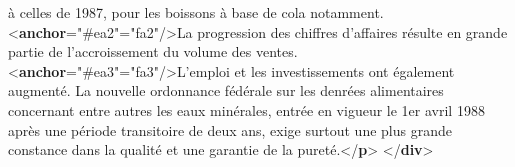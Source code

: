\begin{shaded}
\hspace*{1em}\hspace*{1em} à celles de 1987, pour les boissons à base de cola\mbox{}\newline 
\hspace*{1em}\hspace*{1em} notamment. {<\textbf{anchor}\hspace*{1em}{corresp}="{\#ea2}"\hspace*{1em}{xml:id}="{fa2}"/>}La progression des\mbox{}\newline 
\hspace*{1em}\hspace*{1em} chiffres d'affaires résulte en grande partie de l'accroissement\mbox{}\newline 
\hspace*{1em}\hspace*{1em} du volume des ventes. {<\textbf{anchor}\hspace*{1em}{corresp}="{\#ea3}"\hspace*{1em}{xml:id}="{fa3}"/>}L'emploi et\mbox{}\newline 
\hspace*{1em}\hspace*{1em} les investissements ont également augmenté.\mbox{}\newline 
{}La nouvelle ordonnance fédérale\mbox{}\newline 
\hspace*{1em}\hspace*{1em} sur les denrées alimentaires concernant entre autres les eaux\mbox{}\newline 
\hspace*{1em}\hspace*{1em} minérales, entrée en vigueur le 1er avril 1988 après\mbox{}\newline 
\hspace*{1em}\hspace*{1em} une période transitoire de deux ans, exige surtout une plus\mbox{}\newline 
\hspace*{1em}\hspace*{1em} grande constance dans la qualité et une garantie de la\mbox{}\newline 
\hspace*{1em}\hspace*{1em} pureté.{</\textbf{p}>}\mbox{}\newline 
{</\textbf{div}>}\end{shaded}\egroup\par \par
